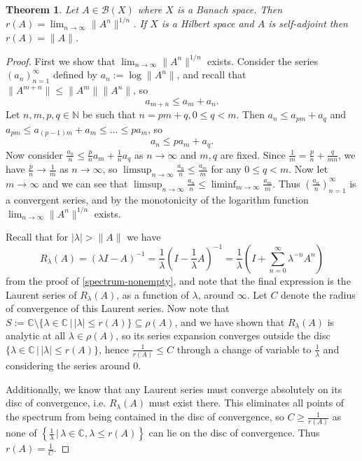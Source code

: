 \documentclass[12pt,oneside]{report}
\newtheorem{thm}{Theorem}[chapter]
\begin{document}
\begin{thm}\label{spectral-radius}
    Let $A \in \mathscr{B}(X)$ where $X$ is a Banach space. Then $r(A) = \lim_{ n \to \infty } \|A^{n}\|^{1/n}$. If $X$ is a Hilbert space and $A$ is self-adjoint then $r(A) = \|A\|$.
\end{thm}
\begin{proof}
    First we show that $\lim_{ n \to \infty } \|A^{n}\|^{1/n}$ exists. Consider the series $(a_{n})_{n=1}^{\infty}$ defined by $a_{n} := \log\|A^{n}\|$, and recall that $\|A^{m+n}\| \leq \|A^{m}\|\|A^{n}\|$, so $$a_{m+n} \leq a_{m} + a_{n}.$$ Let $n,m,p,q \in \mathbb{N}$ be such that $n = pm + q, 0 \leq q < m$. Then $a_{n} \leq a_{pm} + a_{q}$ and $a_{pm} \leq a_{(p-1)m} + a_{m} \leq \dots \leq pa_{m}$, so $$a_{n} \leq pa_{m} + a_{q}.$$ Now consider $\frac{a_{n}}{n} \leq \frac{p}{n}a_{m} + \frac{1}{n}a_{q}$ as $n \to \infty$ and $m, q$ are fixed. Since $\frac{1}{m} = \frac{p}{n} + \frac{q}{mn}$, we have $\frac{p}{n} \to \frac{1}{m}$ as $n \to \infty$, so $\limsup_{n \to \infty} \frac{a_{n}}{n} \leq \frac{a_{m}}{m}$ for any $0 \leq q < m$. Now let $m \to \infty$ and we can see that $\limsup_{n \to \infty}\frac{a_{n}}{n} \leq \liminf_{m \to \infty}\frac{a_{m}}{m}$. Thus $\left( \frac{a_{n}}{n} \right)_{n=1}^{\infty}$ is a convergent series, and by the monotonicity of the logarithm function $\lim_{ n \to \infty }\|A^{n}\|^{1/n}$ exists.
    
    Recall that for $|\lambda| > \|A\|$ we have $$R_{\lambda}(A) = (\lambda I - A)^{-1} = \frac{1}{\lambda}\left( I - \frac{1}{\lambda}A \right)^{-1} = \frac{1}{\lambda}\left( I + \sum_{n=0}^{\infty} \lambda^{-n} A^{n} \right)$$ from the proof of \ref{spectrum-nonempty}, and note that the final expression is the Laurent series of $R_{\lambda}(A)$, as a function of $\lambda$, around $\infty$. Let $C$ denote the radius of convergence of this Laurent series. Now note that $S := \mathbb{C} \setminus \{ \lambda \in \mathbb{C} \, | \, |\lambda| \leq r(A) \} \subseteq \rho(A)$, and we have shown that $R_{\lambda}(A)$ is analytic at all $\lambda \in \rho(A)$, so its series expansion converges outside the disc $\{ \lambda \in \mathbb{C} \, | \, |\lambda| \leq r(A) \}$, hence $\frac{1}{r(A)} \leq C$ through a change of variable to $\frac{1}{\lambda}$ and considering the series around $0$.

    Additionally, we know that any Laurent series must converge absolutely on its disc of convergence, i.e. $R_{\lambda}(A)$ must exist there. This eliminates all points of the spectrum from being contained in the disc of convergence, so $C \geq \frac{1}{r(A)}$ as none of $\left\{  \frac{1}{\lambda} \, | \, \lambda \in \mathbb{C}, \lambda \leq r(A) \right\}$ can lie on the disc of convergence. Thus $r(A) = \frac{1}{C}$.
    

\end{proof}
\end{document}
